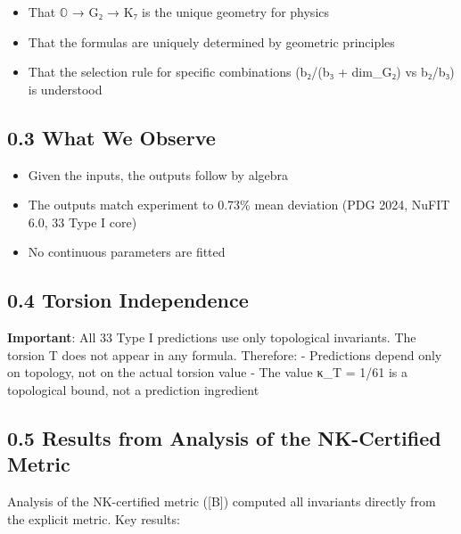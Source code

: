 \documentclass[11pt,a4paper]{article}
\begin{document}
\begin{itemize}
\tightlist
\item
  That \ensuremath{\mathbb{O}} → G₂ → K₇ is the unique geometry for physics
\item
  That the formulas are uniquely determined by geometric principles
\item
  That the selection rule for specific combinations (b₂/(b₃ + dim\_\allowbreak{}G₂) vs b₂/b₃) is understood
\end{itemize}

\subsection{0.3 What We Observe}\label{what-we-observe}

\begin{itemize}
\tightlist
\item
  Given the inputs, the outputs follow by algebra
\item
  The outputs match experiment to 0.73\% mean deviation (PDG 2024, NuFIT 6.0, 33 Type I core)
\item
  No continuous parameters are fitted
\end{itemize}

\subsection{0.4 Torsion Independence}\label{torsion-independence}

\textbf{Important}: All 33 Type I predictions use only topological invariants. The torsion T does not appear in any formula. Therefore: - Predictions depend only on topology, not on the actual torsion value - The value κ\_\allowbreak{}T = 1/61 is a topological bound, not a prediction ingredient

\subsection{0.5 Results from Analysis of the NK-Certified Metric}\label{results-from-analysis-of-the-nk-certified-metric}

Analysis of the NK-certified metric ({[}B{]}) computed all invariants directly from the explicit metric. Key results:
\end{document}
